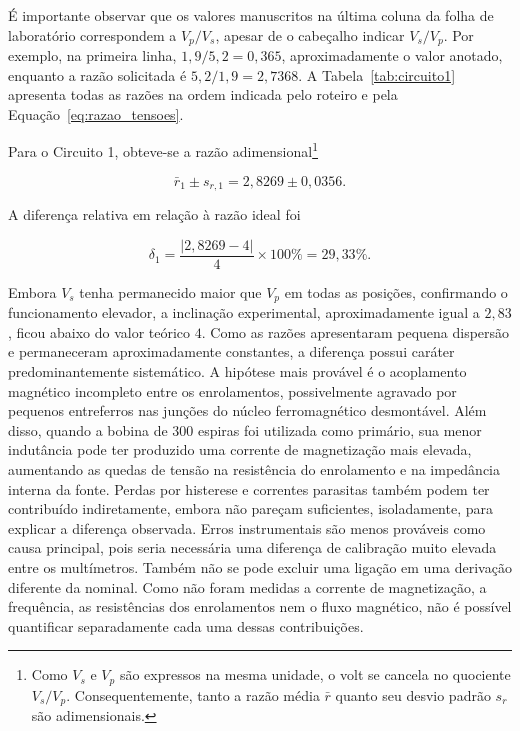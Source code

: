 \documentclass[a4paper,12pt]{article}
\begin{document}
É importante observar que os valores manuscritos na última coluna da folha de
laboratório correspondem a $V_p/V_s$, apesar de o cabeçalho indicar $V_s/V_p$.
Por exemplo, na primeira linha, $1{,}9/5{,}2=0{,}365$, aproximadamente o valor
anotado, enquanto a razão solicitada é $5{,}2/1{,}9=2{,}7368$. A
Tabela~\ref{tab:circuito1} apresenta todas as razões na ordem indicada pelo
roteiro e pela Equação~\eqref{eq:razao_tensoes}.

Para o Circuito 1, obteve-se a razão adimensional\footnote{Como $V_s$ e $V_p$ são expressos na mesma unidade, o volt se cancela no quociente $V_s/V_p$. Consequentemente, tanto a razão média $\bar r$ quanto seu desvio padrão $s_r$ são adimensionais.}


\begin{equation}
  \boxed{\bar r_1\pm s_{r,1}=2{,}8269\pm0{,}0356}.
\end{equation}

A diferença relativa em relação à razão ideal foi

\begin{equation}
  \delta_1=\frac{|2{,}8269-4|}{4}\times100\%=29{,}33\%.
\end{equation}

Embora \(V_s\) tenha permanecido maior que \(V_p\) em todas as posições, confirmando o funcionamento elevador, a inclinação experimental, aproximadamente igual a \(2{,}83\), ficou abaixo do valor teórico \(4\). Como as razões apresentaram pequena dispersão e permaneceram aproximadamente constantes, a diferença possui caráter predominantemente sistemático. A hipótese mais provável é o acoplamento magnético incompleto entre os enrolamentos, possivelmente agravado por pequenos entreferros nas junções do núcleo ferromagnético desmontável. Além disso, quando a bobina de 300 espiras foi utilizada como primário, sua menor indutância pode ter produzido uma corrente de magnetização mais elevada, aumentando as quedas de tensão na resistência do enrolamento e na impedância interna da fonte. Perdas por histerese e correntes parasitas também podem ter contribuído indiretamente, embora não pareçam suficientes, isoladamente, para explicar a diferença observada. Erros instrumentais são menos prováveis como causa principal, pois seria necessária uma diferença de calibração muito elevada entre os multímetros. Também não se pode excluir uma ligação em uma derivação diferente da nominal. Como não foram medidas a corrente de magnetização, a frequência, as resistências dos enrolamentos nem o fluxo magnético, não é possível quantificar separadamente cada uma dessas contribuições.
\end{document}
